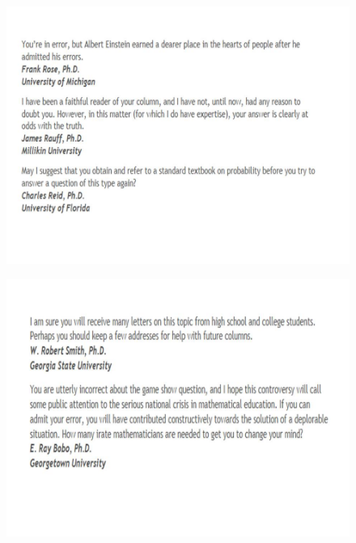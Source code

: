 \documentclass{beamer}
\begin{document}
\begin{frame}
	\begin{figure}
		\centering
		\includegraphics[width=1.16\linewidth]{MontyHall/Slide10}
		
	\end{figure}
	
\end{frame}

\begin{frame}
	\begin{figure}
		\centering
		\includegraphics[width=1.17\linewidth]{MontyHall/Slide11}
		
	\end{figure}
	
\end{frame}
\end{document}
